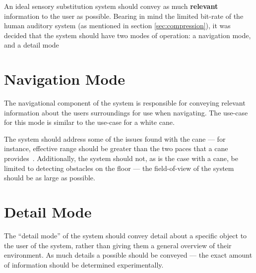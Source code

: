An ideal sensory substitution system should convey as much \textbf{relevant} information to the user as possible. Bearing in mind the limited bit-rate of the human auditory system (as mentioned in section \ref{sec:compression}), it was decided that the system should have two modes of operation: a navigation mode, and a detail mode

\section{Navigation Mode}
The navigational component of the system is responsible for conveying relevant information about the users surroundings for use when navigating. The use-case for this mode is similar to the use-case for a white cane.

The system should address some of the issues found with the cane --- for instance, effective range should be greater than the two paces that a cane provides~\cite{mobilityenhancement}. Additionally, the system should not, as is the case with a cane, be limited to detecting obstacles on the floor --- the field-of-view of the system should be as large as possible.

\section{Detail Mode}
The ``detail mode'' of the system should convey detail about a specific object to the user of the system, rather than giving them a general overview of their environment. As much details a possible should be conveyed --- the exact amount of information should be determined experimentally.
